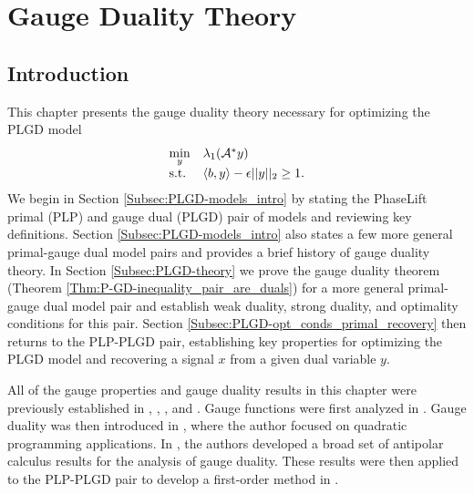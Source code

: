 \chapter{Gauge Duality Theory}	\label{Sec:PLGD}




\section{Introduction} 	\label{Subsec:PLGD-intro}

This chapter presents the gauge duality theory necessary for optimizing the PLGD model 
\begin{equation*}
\begin{array}{ll}
	\min\limits_{\substack{y}}
					&	\lambda_1({\mathcal A}^* y)
						\\
	\textnormal{s.t.}
					&	\langle b, y \rangle - \epsilon ||y||_2 \geq 1.
\end{array}
\end{equation*}
We begin in Section \ref{Subsec:PLGD-models_intro} by stating the PhaseLift primal (PLP) and gauge dual (PLGD) pair of models and reviewing key definitions.
Section \ref{Subsec:PLGD-models_intro} also states a few more general primal-gauge dual model pairs and provides a brief history of gauge duality theory.
In Section \ref{Subsec:PLGD-theory} we prove the gauge duality theorem (Theorem \ref{Thm:P-GD-inequality_pair_are_duals}) for a more general primal-gauge dual model pair and establish weak duality, strong duality, and optimality conditions for this pair.
Section \ref{Subsec:PLGD-opt_conds_primal_recovery} then returns to the PLP-PLGD pair, establishing key properties for optimizing the PLGD model and recovering a signal $x$ from a given dual variable $y$.  

All of the gauge properties and gauge duality results in this chapter were previously established in \cite{rockafellar1970convex}, \cite{DBLP:journals/mp/Freund87}, \cite{DBLP:journals/siamjo/FriedlanderMP14}, and \cite{DBLP:journals/siamsc/FriedlanderM16}.  Gauge functions were first analyzed in  \cite{rockafellar1970convex}.  Gauge duality was then introduced in \cite{DBLP:journals/mp/Freund87}, where the author focused on quadratic programming applications.  
In \cite{DBLP:journals/siamjo/FriedlanderMP14}, the authors developed a broad set of antipolar calculus results for the analysis of gauge duality.  
These results were then applied to the PLP-PLGD pair to develop a first-order method in \cite{DBLP:journals/siamsc/FriedlanderM16}.


